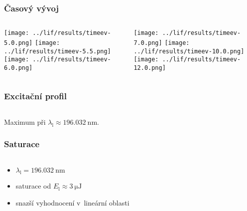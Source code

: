 \documentclass{beamer}
\newcommand\en{E}
\newcommand\enlaser{\en_\mathrm{l}}
\newcommand\wavelen{\lambda}
\newcommand\wavelenlaser{\wavelen_\mathrm{l}}
\begin{document}
\begin{frame}
	\frametitle{Časový vývoj}
	\begin{columns}[c]
		\begin{column}{0.48\textwidth}
			\centering
			\texttt{[image: ../lif/results/timeev-5.0.png]}
			\texttt{[image: ../lif/results/timeev-5.5.png]}
			\texttt{[image: ../lif/results/timeev-6.0.png]}
		\end{column}
		\begin{column}{0.48\textwidth}
			\centering
			\texttt{[image: ../lif/results/timeev-7.0.png]}
			\texttt{[image: ../lif/results/timeev-10.0.png]}
			\texttt{[image: ../lif/results/timeev-12.0.png]}
		\end{column}
	\end{columns}
\end{frame}

\begin{frame}
	\frametitle{Excitační profil}
	\begin{columns}[c]
		\begin{column}{0.48\textwidth}
		\end{column}
		\begin{column}{0.48\textwidth}
		\end{column}
	\end{columns}
	\bigskip
	Maximum při $\wavelenlaser \approx \SI{196.032}{\nano\metre}$.
\end{frame}

\begin{frame}
	\frametitle{Saturace}
	\begin{columns}[c]
		\begin{column}{0.38\textwidth}
			\begin{itemize}
				\item $\wavelenlaser = \SI{196.032}{\nano\metre}$
				\item saturace od $\enlaser \approx \SI{3}{\micro\joule}$
				\item snazší vyhodnocení v~lineární oblasti
			\end{itemize}
		\end{column}
		\begin{column}{0.58\textwidth}
		\end{column}
	\end{columns}
\end{frame}
\end{document}
